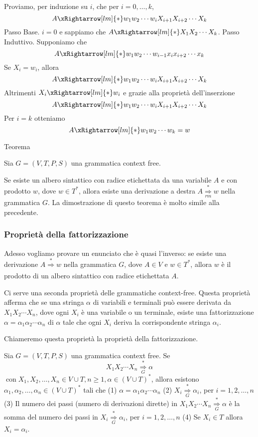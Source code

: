 \vspace{5mm}

Proviamo, per induzione su $i$, che per $i=0, \ldots, k$,
$$
A \xRightarrow[lm]{*} w_{1} w_{2} \cdots w_{i} X_{i+1} X_{i+2} \cdots X_{k}
$$
Passo Base. $i=0$ e sappiamo che $A \xRightarrow[lm]{*} X_{1} X_{2} \cdots X_{k}$.
Passo Induttivo. Supponiamo che
$$
A \xRightarrow[lm]{*} w_{1} w_{2} \cdots w_{i-1} x_{i} x_{i+2} \cdots x_{k}
$$
Se $X_{i}=w_{i}$, allora
$$
A \xRightarrow[lm]{*} w_{1} w_{2} \cdots w_{i} X_{i+1} X_{i+2} \cdots X_{k}
$$
Altrimenti $X_{i} \xRightarrow[lm]{*} w_{i}$ e grazie alla proprietà dell'inserzione
$$
A \xRightarrow[lm]{*} w_{1} w_{2} \cdots w_{i} X_{i+1} X_{i+2} \cdots X_{k}
$$
Per $i=k$ otteniamo
$$
A \xRightarrow[lm]{*} w_{1} w_{2} \cdots w_{k}=w
$$

\vspace{5mm}

Teorema

Sia $G=(V, T, P, S)$ una grammatica context free.

Se esiste un albero sintattico con radice etichettata da una variabile $A$ e con prodotto $w$, dove $w \in T^{*}$, allora esiste una derivazione a destra $A \underset{r m}{\stackrel{*}{\Rightarrow}} w$ nella grammatica $G$.
La dimostrazione di questo teorema è molto simile alla precedente.

\subsubsection{Proprietà della fattorizzazione}

Adesso vogliamo provare un enunciato che è quasi l'inverso: se esiste una derivazione $A \underset{}{\stackrel{*}{\Rightarrow}} w$ nella grammatica $G$, dove $A \in V$ e $w \in T^{*}$, allora $w$ è il prodotto di un albero sintattico con radice etichettata $A$.

Ci serve una seconda proprietà delle grammatiche context-free. Questa proprietà afferma che se una stringa $\alpha$ di variabili e terminali può essere derivata da $X_{1} X_{2} \cdots X_{n}$, dove ogni $X_{i}$ è una variabile o un terminale, esiste una fattorizzazione $\alpha=\alpha_{1} \alpha_{2} \cdots \alpha_{n}$ di $\alpha$ tale che ogni $X_{i}$ deriva la corrispondente stringa $\alpha_{i}$.

Chiameremo questa proprietà la proprietà della fattorizzazione.

Sia $G=(V, T, P, S)$ una grammatica context free. Se
$$
X_{1} X_{2} \cdots X_{n} \underset{G}{\stackrel{*}{\Rightarrow}} \alpha
$$
$\operatorname{con} X_{1}, X_{2}, \ldots, X_{n} \in V \cup T, n \geq 1, \alpha \in(V \cup T)^{*}$, allora esistono $\alpha_{1}, \alpha_{2}, \ldots, \alpha_{n} \in(V \cup T)^{*}$ tali che
(1) $\alpha=\alpha_{1} \alpha_{2} \cdots \alpha_{n}$
(2) $X_{i} \underset{G}{\stackrel{*}{\Rightarrow}} \alpha_{i}$, per $i=1,2, \ldots, n$
(3) Il numero dei passi (numero di derivazioni dirette) in $X_{1} X_{2} \cdots X_{n} \underset{G}{\stackrel{*}{\Rightarrow}} \alpha$ è la somma del numero dei passi in $X_{i} \underset{G}{\stackrel{*}{\Rightarrow}} \alpha_{i}$, per $i=1,2, \ldots, n$
(4) Se $X_{i} \in T$ allora $X_{i}=\alpha_{i}$.

